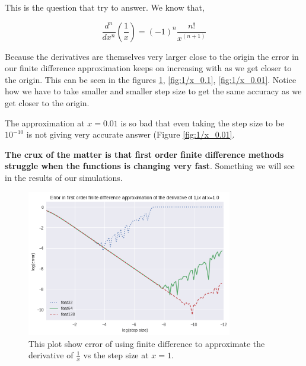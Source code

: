This is the question that  try to answer. We know that,

\begin{equation}
    \frac{d^n}{dx^n}\left(\frac{1}{x}\right) = (-1)^n \frac{n!}{x^(n+1)}
\end{equation}

Because the derivatives are themselves very larger close to the origin the error in our finite difference approximation keeps on increasing with as we get closer to the origin. This can be seen in the figures \ref{fig:1/x_1}, \ref{fig:1/x_0.1}, \ref{fig:1/x_0.01}. Notice how we have to take smaller and smaller step size to get the same accuracy as we get closer to the origin.

The approximation at $x=0.01$ is so bad that even taking the step size to be $10^{-10}$ is not giving very accurate answer (Figure \ref{fig:1/x_0.01}.

\textbf{The crux of the matter is that first order finite difference methods struggle when the functions is changing very fast}. Something we will see in the results of our simulations.


\begin{figure}[hbt!]
    \centering
    \includegraphics[width=0.8\textwidth]{images/1_x_error_at_1.png}
    \caption{This plot show error of using finite difference to approximate the derivative of $\frac{1}{x}$ vs the step size at $x = 1$.}
    \label{fig:1/x_1}
\end{figure}

